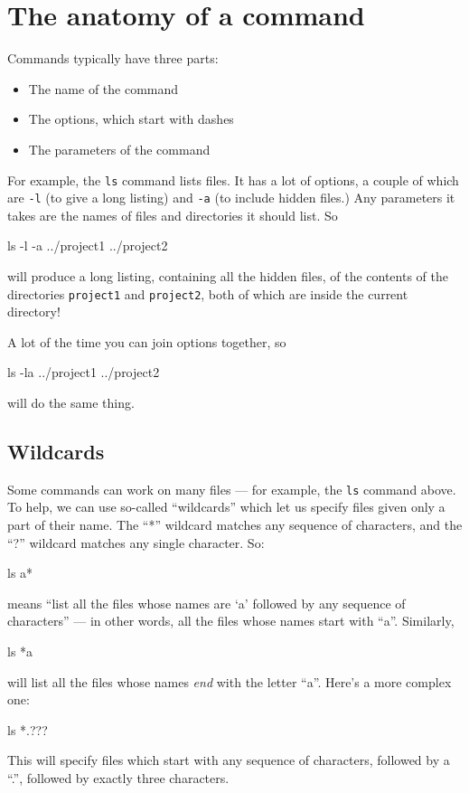 \documentclass[twocolumn]{article}
\begin{document}
\section{The anatomy of a command}
Commands typically have three parts:
\begin{itemize}
\item The name of the command
\item The options, which start with dashes
\item The parameters of the command
\end{itemize}
For example, the \verb+ls+ command lists files. It has a lot of options,
a couple of which are \verb+-l+ (to give a long listing) and \texttt{-a}
(to include hidden files.) Any parameters it takes are the names of files
and directories it should list. So
\begin{v}
ls -l -a ../project1 ../project2
\end{v}
will produce a long listing, containing all the hidden files, of 
the contents of the directories \verb+project1+ and \verb+project2+, both
of which are inside the current directory!

A lot of the time you can join options together, so 
\begin{v}
ls -la  ../project1 ../project2
\end{v}
will do the same thing.

\subsection{Wildcards}
Some commands can work on many files --- for example, the \verb+ls+ command
above. To help, we can use so-called ``wildcards'' which let us 
specify files given only a part of their name. The ``*'' wildcard matches
any sequence of characters, and the ``?'' wildcard matches any single
character. So:
\begin{v}
ls a*
\end{v}
means ``list all the files whose names are `a' followed by any sequence 
of characters'' --- in other words, all the files whose names start with
``a''. Similarly,
\begin{v}
ls *a
\end{v}
will list all the files whose names \emph{end} with the letter ``a''.
Here's a more complex one:
\begin{v}
ls *.???
\end{v}
This will specify files which start with any sequence of characters,
followed by a ``.'', followed by exactly three characters. 
\end{document}
